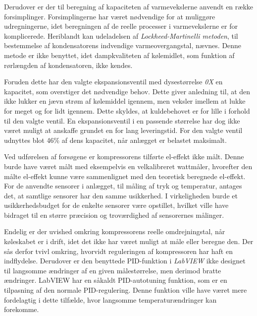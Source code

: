 \documentclass[../Hovedrapport.tex]{subfiles}
\begin{document}
Derudover er der til beregning af kapaciteten af varmevekslerne anvendt en række forsimplinger. Forsimplingerne har været nødvendige for at muliggøre udregningerne, idet beregningen af de reelle processer i varmevekslerne er for komplicerede. Heriblandt kan udeladelsen af \textit{Lockheed-Martinelli metoden}, til bestemmelse af kondensatorens indvendige varmeovergangstal, nævnes. Denne metode er ikke benyttet, idet dampkvaliteten af kølemidlet, som funktion af rørlængden af kondensatoren, ikke kendes.

Foruden dette har den valgte ekspansionsventil med dysestørrelse \textit{0X} en kapacitet, som overstiger det nødvendige behov. Dette giver anledning til, at den ikke lukker en jævn strøm af kølemiddel igennem, men veksler imellem at lukke for meget og for lidt igennem. Dette skyldes, at kuldebehovet er for lille i forhold til den valgte ventil. En ekspansionsventil i en passende størrelse har dog ikke været muligt at anskaffe grundet en for lang leveringstid. For den valgte ventil udnyttes blot 46\% af dens kapacitet, når anlægget er belastet maksimalt.

Ved udførelsen af forsøgene er kompressorens tilførte el-effekt ikke målt. Denne burde have været målt med eksempelvis en velkalibreret wattmåler, hvorefter den målte el-effekt kunne være sammenlignet med den teoretisk beregnede el-effekt. For de anvendte sensorer i anlægget, til måling af tryk og temperatur, antages det, at samtlige sensorer har den samme usikkerhed. I virkeligheden burde et usikkerhedsbudget for de enkelte sensorer være opstillet, hvilket ville have bidraget til en større præcision og troværdighed af sensorernes målinger. 

Endelig er der uvished omkring kompressorens reelle omdrejningstal, når køleskabet er i drift, idet det ikke har været muligt at måle eller beregne den. Der sås derfor tvivl omkring, hvorvidt reguleringen af kompressoren har haft en indflydelse. Derudover er den benyttede PID-funktion i \textit{LabVIEW} ikke designet til langsomme ændringer af en given målestørrelse, men derimod bratte ændringer. LabVIEW har en såkaldt PID-autotuning funktion, som er en tilpasning af den normale PID-regulering. Denne funktion ville have været mere fordelagtig i dette tilfælde, hvor langsomme temperaturændringer kan forekomme. 
\end{document}
